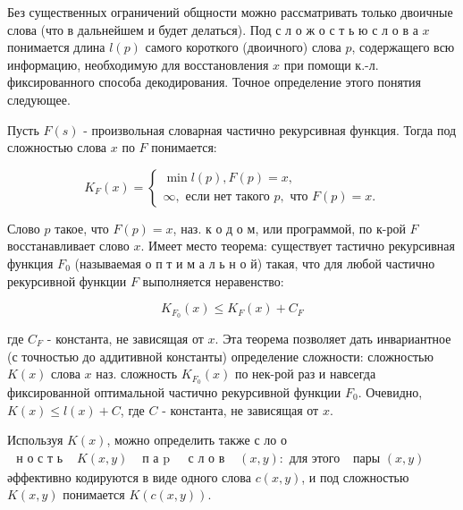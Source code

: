 \documentclass[10pt]{article}
\begin{document}
Без существенных ограничений общности можно рассматривать только двоичные слова (что в дальнейшем и будет делаться). Под с л о ж о с т ь ю с л о в а $x$ понимается длина $l(p)$ самого короткого (двоичного) слова $p$, содержащего всю информацию, необходимую для восстановления $x$ при помощи к.-л. фиксированного способа декодирования. Точное определение этого понятия следующее.



Пусть $F(s)$ - произвольная словарная частично рекурсивная функция. Тогда под сложностью слова $x$ по $F$ понимается:



\[

K_{F}(x)=\left\{\begin{array}{l}

\min l(p), F(p)=x, \\

\infty, \text { если нет такого } p, \text { что } F(p)=x .

\end{array}\right.

\]



Слово $p$ такое, что $F(p)=x$, наз. к о д о м, или программой, по к-рой $F$ восстанавливает слово $x$. Имеет место теорема: существует тастично рекурсивная функция $F_{0}$ (называемая о п т и м а л ь н о й) такая, что для любой частично рекурсивной функции $F$ выполняется неравенство:



\[

K_{F_{0}}(x) \leqslant K_{F}(x)+C_{F}

\]



где $C_{F}$ - константа, не зависящая от $x$. Эта теорема позволяет дать инвариантное (с точностью до аддитивной константы) определение сложности: сложностью $K(x)$ слова $x$ наз. сложность $K_{F_{0}}(x)$ по нек-рой раз и навсегда фиксированной оптимальной частично рекурсивной функции $F_{0}$. Очевидно, $K(x) \leqslant l(x)+C$, где $C$ - константа, не зависящая от $x$.



Используя $K(x)$, можно определить также с ло о$\begin{array}{llllll}\text { н о с т ь } & K(x, y) & \text { п а p } & \text { с л о в } & (x, y): \text { для этого }\end{array}$ пары $(x, y)$ әффективно кодируются в виде одного слова $c(x, y)$, и под сложностью $K(x, y)$ понимается $K(c(x, y))$.
\end{document}
